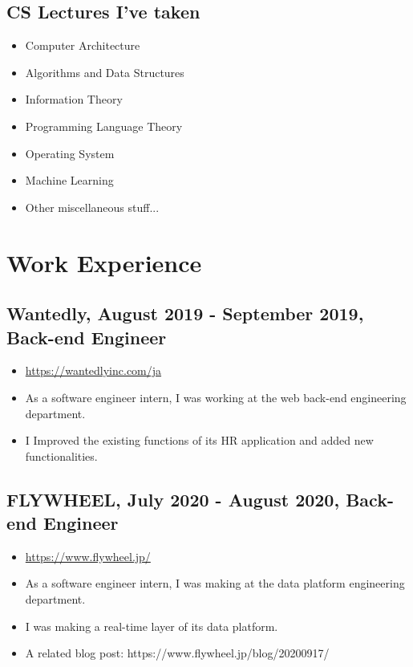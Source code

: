 \documentclass{article}
\begin{document}
  \subsection*{CS Lectures I've taken}
    \begin{itemize}
      \item Computer Architecture
      \item Algorithms and Data Structures
      \item Information Theory
      \item Programming Language Theory
      \item Operating System
      \item Machine Learning
      \item Other miscellaneous stuff...
    \end{itemize}

\section*{Work Experience}
  \subsection*{Wantedly, August 2019 - September 2019, Back-end Engineer}
    \begin{itemize}
      \item \url{https://wantedlyinc.com/ja}
      \item As a software engineer intern, I was working at the web back-end engineering department.
      \item I Improved the existing functions of its HR application and added new functionalities.
    \end{itemize}

  \subsection*{FLYWHEEL, July 2020 - August 2020, Back-end Engineer}
    \begin{itemize}
      \item \url{https://www.flywheel.jp/}
      \item As a software engineer intern, I was making at the data platform engineering department.
      \item I was making a real-time layer of its data platform.
      \item A related blog post: https://www.flywheel.jp/blog/20200917/
    \end{itemize}
\end{document}
